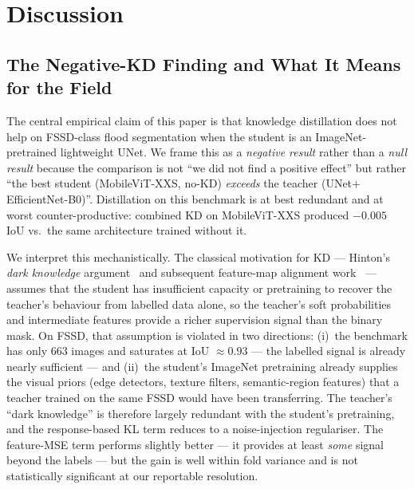 
\section{Discussion}
\label{sec:discussion}

\subsection{The Negative-KD Finding and What It Means for the Field}
\label{sec:discussion-negative-kd}

The central empirical claim of this paper is that knowledge distillation does not help on FSSD-class flood segmentation when the student is an ImageNet-pretrained lightweight UNet. We frame this as a \emph{negative result} rather than a \emph{null result} because the comparison is not ``we did not find a positive effect'' but rather ``the best student (MobileViT-XXS, no-KD) \emph{exceeds} the teacher (UNet$+$EfficientNet-B0)''. Distillation on this benchmark is at best redundant and at worst counter-productive: combined KD on MobileViT-XXS produced $-0.005$ IoU vs.~the same architecture trained without it.

We interpret this mechanistically. The classical motivation for KD --- Hinton's \emph{dark knowledge} argument~\cite{hinton2015distilling} and subsequent feature-map alignment work~\cite{romero2015fitnets,liu2019structured,wang2020intra,he2021channel} --- assumes that the student has insufficient capacity or pretraining to recover the teacher's behaviour from labelled data alone, so the teacher's soft probabilities and intermediate features provide a richer supervision signal than the binary mask. On FSSD, that assumption is violated in two directions: (i)~the benchmark has only 663 images and saturates at IoU $\approx 0.93$ --- the labelled signal is already nearly sufficient --- and (ii)~the student's ImageNet pretraining already supplies the visual priors (edge detectors, texture filters, semantic-region features) that a teacher trained on the same FSSD would have been transferring. The teacher's ``dark knowledge'' is therefore largely redundant with the student's pretraining, and the response-based KL term reduces to a noise-injection regulariser. The feature-MSE term performs slightly better --- it provides at least \emph{some} signal beyond the labels --- but the gain is well within fold variance and is not statistically significant at our reportable resolution.


